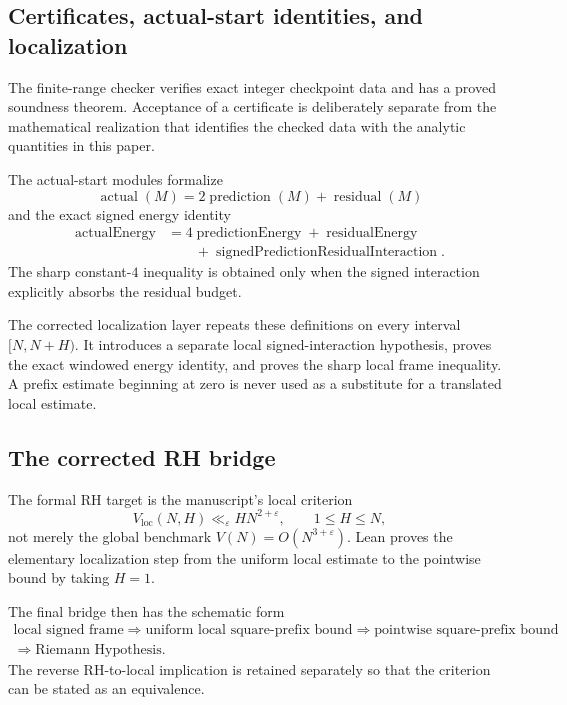 \documentclass[11pt]{article}
\theoremstyle{definition}
\theoremstyle{remark}
\newcommand{\eps}{\varepsilon}
\newcommand{\1}{\mathbf{1}}
\begin{document}
\subsection{Certificates, actual-start identities, and localization}

The finite-range checker verifies exact integer checkpoint data and has a proved soundness theorem.  Acceptance of a certificate is deliberately separate from the mathematical realization that identifies the checked data with the analytic quantities in this paper.

The actual-start modules formalize
\[
 \operatorname{actual}(M)
 =2\operatorname{prediction}(M)+\operatorname{residual}(M)
\]
and the exact signed energy identity
\[
 \begin{aligned}
 \operatorname{actualEnergy}
 &=4\operatorname{predictionEnergy}
 +\operatorname{residualEnergy}\\
 &\qquad+\operatorname{signedPredictionResidualInteraction}.
 \end{aligned}
\]
The sharp constant-$4$ inequality is obtained only when the signed interaction explicitly absorbs the residual budget.

The corrected localization layer repeats these definitions on every interval $[N,N+H)$.  It introduces a separate local signed-interaction hypothesis, proves the exact windowed energy identity, and proves the sharp local frame inequality.  A prefix estimate beginning at zero is never used as a substitute for a translated local estimate.

\subsection{The corrected RH bridge}

The formal RH target is the manuscript's local criterion
\[
 V_{\mathrm{loc}}(N,H)\ll_\eps HN^{2+\eps},
 \qquad 1\le H\le N,
\]
not merely the global benchmark $V(N)=O(N^{3+\eps})$.  Lean proves the elementary localization step from the uniform local estimate to the pointwise bound by taking $H=1$.

The final bridge then has the schematic form
\[
 \begin{gathered}
 \text{local signed frame}
 \Longrightarrow \text{uniform local square-prefix bound}
 \Longrightarrow \text{pointwise square-prefix bound}\\
 \Longrightarrow \text{Riemann Hypothesis}.
 \end{gathered}
\]
The reverse RH-to-local implication is retained separately so that the criterion can be stated as an equivalence.
\end{document}

